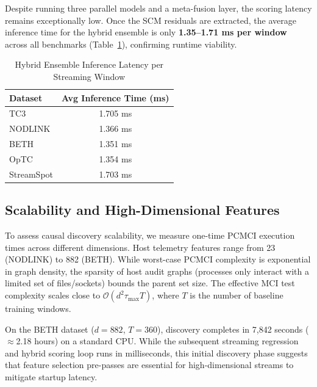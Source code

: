 Despite running three parallel models and a meta-fusion layer, the scoring latency remains exceptionally low. Once the SCM residuals are extracted, the average inference time for the hybrid ensemble is only \textbf{1.35--1.71 ms per window} across all benchmarks (Table~\ref{tab:runtime_hybrid}), confirming runtime viability.

\begin{table}[htbp]
\caption{Hybrid Ensemble Inference Latency per Streaming Window}
\begin{center}
\begin{tabular}{|l|c|}
\hline
\textbf{Dataset} & \textbf{Avg Inference Time (ms)} \\
\hline
TC3 & 1.705 ms \\
NODLINK & 1.366 ms \\
BETH & 1.351 ms \\
OpTC & 1.354 ms \\
StreamSpot & 1.703 ms \\
\hline
\end{tabular}
\label{tab:runtime_hybrid}
\end{center}
\end{table}

\subsection{Scalability and High-Dimensional Features}
To assess causal discovery scalability, we measure one-time PCMCI execution times across different dimensions. Host telemetry features range from 23 (NODLINK) to 882 (BETH). While worst-case PCMCI complexity is exponential in graph density, the sparsity of host audit graphs (processes only interact with a limited set of files/sockets) bounds the parent set size. The effective MCI test complexity scales close to $\mathcal{O}(d^2 \tau_{\max} T)$, where $T$ is the number of baseline training windows. 

On the BETH dataset ($d = 882$, $T = 360$), discovery completes in 7,842 seconds ($\approx$2.18 hours) on a standard CPU. While the subsequent streaming regression and hybrid scoring loop runs in milliseconds, this initial discovery phase suggests that feature selection pre-passes are essential for high-dimensional streams to mitigate startup latency.
